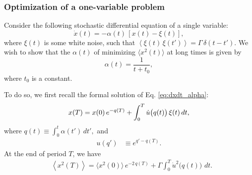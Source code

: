 \documentclass[reprint, superscriptaddress, floatfix]{revtex4-1}
\begin{document}
\subsubsection{\label{sec:onevar}
Optimization of a one-variable problem}



Consider the following stochastic differential equation
of a single variable:
%
\begin{equation}
\dot x(t) = -\alpha(t) \, \left[ x(t) - \xi(t) \right],
\label{eq:dxdt_alpha}
\end{equation}
%
where $\xi(t)$ is some white noise, such that
%
$
  \left\langle \xi(t) \, \xi(t') \right\rangle
  =
  \Gamma \, \delta(t - t')
  .
$
%
We wish to show that the $\alpha(t)$
of minimizing $\langle x^2(t) \rangle$ at long times
is given by
%
\begin{equation}
  \alpha(t) = \frac{ 1 }{ t + t_0 },
\label{eq:alpha_invt1}
\end{equation}
%
where $t_0$ is a constant.


To do so, we first recall
the formal solution of Eq. \eqref{eq:dxdt_alpha}:
%
\begin{equation}
x(T)
=
x(0) \, e^{-q(T)}
+
\int_0^T
  \dot u\bigl( q(t) \bigr) \, \xi(t) \, dt,
\notag
\end{equation}
%
where
%
$
q(t) \equiv \int_0^t \alpha(t') \, dt',
$
%
and
%
\begin{align}
u(q')
&\equiv
e^{q' - q(T)}.
\label{eq:u_def}
\end{align}
%
At the end of period $T$, we have
%
\begin{align}
  &\left\langle x^2(T) \right\rangle
  =
  \langle x^2(0) \rangle \, e^{-2 \, q(T)}
  +
  \Gamma \int_0^T
    {\dot u}^2\bigl( q(t) \bigr) \,
    \, dt.
  \label{eq:x2t_average}
\end{align}
\end{document}
